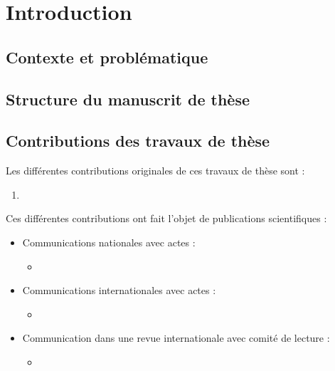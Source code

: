 \chapter*{Introduction}

\section*{Contexte et problématique}
\section*{Structure du manuscrit de thèse}
\section*{Contributions des travaux de thèse}
Les différentes contributions originales de ces travaux de thèse sont : 
\begin{enumerate}
	\item 
\end{enumerate}
Ces différentes contributions ont fait l'objet de publications scientifiques : \\
\begin{itemize}
	\item Communications nationales avec actes :
	\begin{itemize}
     	\item 
	\end{itemize}
	\item Communications internationales avec actes :
	\begin{itemize}
		\item 
	\end{itemize}
	\item Communication dans une revue internationale avec comité de lecture :
	\begin{itemize}
		\item 
	\end{itemize}
\end{itemize}



